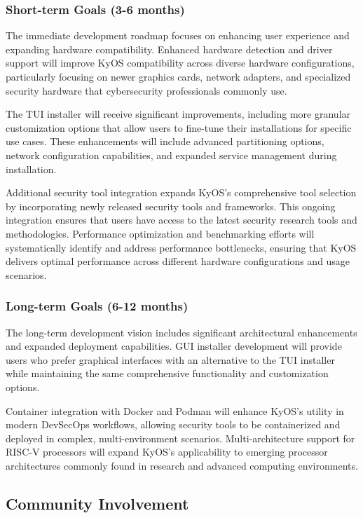 \documentclass[12pt,a4paper]{article}
\begin{document}
\subsubsection{Short-term Goals (3-6 months)}
The immediate development roadmap focuses on enhancing user experience and expanding hardware compatibility. Enhanced hardware detection and driver support will improve KyOS compatibility across diverse hardware configurations, particularly focusing on newer graphics cards, network adapters, and specialized security hardware that cybersecurity professionals commonly use.

The TUI installer will receive significant improvements, including more granular customization options that allow users to fine-tune their installations for specific use cases. These enhancements will include advanced partitioning options, network configuration capabilities, and expanded service management during installation.

Additional security tool integration expands KyOS's comprehensive tool selection by incorporating newly released security tools and frameworks. This ongoing integration ensures that users have access to the latest security research tools and methodologies. Performance optimization and benchmarking efforts will systematically identify and address performance bottlenecks, ensuring that KyOS delivers optimal performance across different hardware configurations and usage scenarios.

\subsubsection{Long-term Goals (6-12 months)}
The long-term development vision includes significant architectural enhancements and expanded deployment capabilities. GUI installer development will provide users who prefer graphical interfaces with an alternative to the TUI installer while maintaining the same comprehensive functionality and customization options.

Container integration with Docker and Podman will enhance KyOS's utility in modern DevSecOps workflows, allowing security tools to be containerized and deployed in complex, multi-environment scenarios. Multi-architecture support for RISC-V processors will expand KyOS's applicability to emerging processor architectures commonly found in research and advanced computing environments.

\subsection{Community Involvement}
\end{document}

